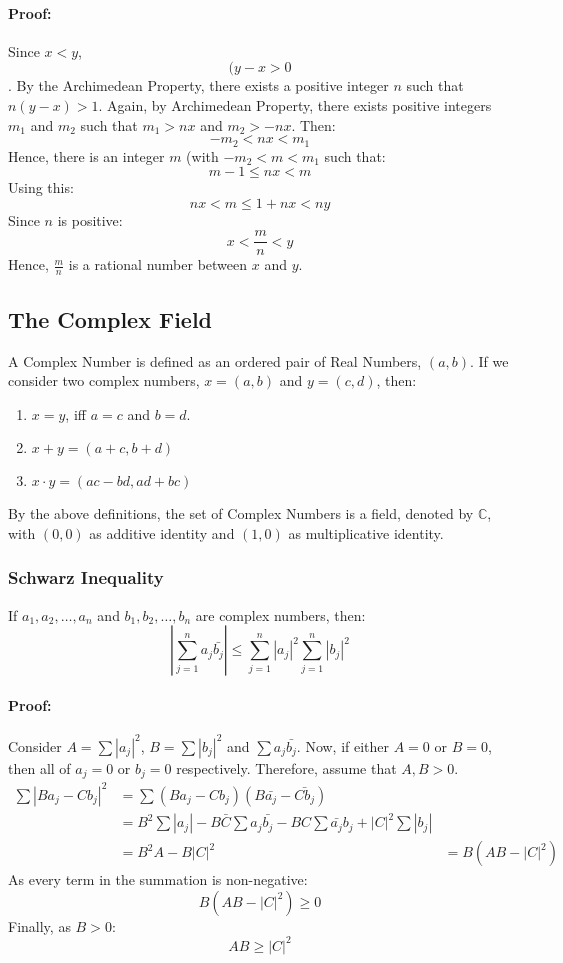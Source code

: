\documentclass[12pt, oneside]{book}
\begin{document}
\paragraph{Proof:} Since \(x<y\), \[(y-x > 0\].
By the Archimedean Property, there exists a positive integer \(n\) such that \(n(y-x) > 1\).
Again, by Archimedean Property, there exists positive integers \(m_1\) and \(m_2\) such that \(m_1 > nx\) and \(m_2 > -nx\).
Then: \[ -m_2 < nx < m_1 \]
Hence, there is an integer \(m\) (with \( -m_2 < m < m_1 \) such that:
\[ m-1 \leq nx < m \]
Using this:
\[ nx < m \leq 1+nx <ny \]
Since \(n\) is positive:
\[ x < \frac{m}{n} < y \]
Hence, \(\frac{m}{n}\) is a rational number between \(x\) and \(y\).

\subsection{The Complex Field}
A Complex Number is defined as an ordered pair of Real Numbers, \((a,b)\).
If we consider two complex numbers, \(x=(a,b)\) and \(y=(c,d)\), then:
\begin{enumerate}
	\item \(x = y\), iff \(a=c\) and \(b=d\).
	\item \(x+y = (a+c,b+d)\)
	\item \(x \cdot y = (ac-bd,ad+bc)\)
\end{enumerate}
By the above definitions, the set of Complex Numbers is a field, denoted by \(\mathbb{C}\), with \((0,0)\) as additive identity and \((1,0)\) as multiplicative identity.

\subsubsection{Schwarz Inequality}
If \( a_1, a_2, \dots, a_n \) and \( b_1, b_2, \dots, b_n \) are complex numbers, then:
\[ \left| \sum_{j=1}^{n} a_j \bar{b_j} \right| \leq \sum_{j=1}^{n} \left|a_j\right|^2 \sum_{j=1}^{n} \left|b_j\right|^2 \]

\paragraph{Proof:} Consider \(A = \sum |a_j|^2 \), \(B = \sum |b_j|^2\) and \(\sum a_j \bar{b_j}\).
Now, if either \(A=0\) or \(B=0\), then all of \(a_j=0\) or \(b_j=0\) respectively.
Therefore, assume that \(A,B>0\).
\begin{align*}
	\sum \left| Ba_j - Cb_j \right|^2 & = \sum \left( Ba_j - Cb_j \right)\left( B \bar{a_j} - \bar{Cb_j} \right)                                                   \\
	                                  & = B^2 \sum \left|a_j\right| - B\bar{C} \sum a_j \bar{b_j} - BC \sum \bar{a_j} b_j + \left|C\right|^2 \sum \left|b_j\right| \\
	                                  & = B^2 A - B\left|C\right|^2
	                                  & = B\left(AB - \left|C\right|^2\right)
\end{align*}
As every term in the summation is non-negative:
\[B\left(AB - |C|^2\right) \geq 0\]
Finally, as \(B>0\):
\[ AB \geq |C|^2\]
\end{document}
